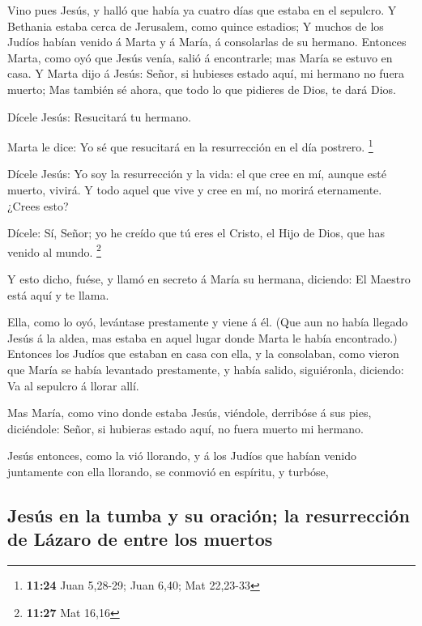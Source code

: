  Vino pues Jesús, y halló que había ya cuatro días que
estaba en el sepulcro.  Y Bethania estaba cerca de
Jerusalem, como quince estadios;  Y muchos de los Judíos
habían venido á Marta y á María, á consolarlas de su hermano.
 Entonces Marta, como oyó que Jesús venía, salió á
encontrarle; mas María se estuvo en casa.  Y Marta dijo á
Jesús: Señor, si hubieses estado aquí, mi hermano no fuera muerto;
 Mas también sé ahora, que todo lo que pidieres de Dios,
te dará Dios.

 Dícele Jesús: Resucitará tu hermano.

 Marta le dice: Yo sé que resucitará en la resurrección
en el día postrero. \footnote{\textbf{11:24} Juan 5,28-29; Juan 6,40;
  Mat 22,23-33}

 Dícele Jesús: Yo soy la resurrección y la vida: el que
cree en mí, aunque esté muerto, vivirá.  Y todo aquel que
vive y cree en mí, no morirá eternamente. ¿Crees esto?

 Dícele: Sí, Señor; yo he creído que tú eres el Cristo,
el Hijo de Dios, que has venido al mundo. \footnote{\textbf{11:27} Mat
  16,16}

 Y esto dicho, fuése, y llamó en secreto á María su
hermana, diciendo: El Maestro está aquí y te llama.

 Ella, como lo oyó, levántase prestamente y viene á él.
 (Que aun no había llegado Jesús á la aldea, mas estaba
en aquel lugar donde Marta le había encontrado.) 
Entonces los Judíos que estaban en casa con ella, y la consolaban, como
vieron que María se había levantado prestamente, y había salido,
siguiéronla, diciendo: Va al sepulcro á llorar allí.

 Mas María, como vino donde estaba Jesús, viéndole,
derribóse á sus pies, diciéndole: Señor, si hubieras estado aquí, no
fuera muerto mi hermano.

 Jesús entonces, como la vió llorando, y á los Judíos que
habían venido juntamente con ella llorando, se conmovió en espíritu, y
turbóse,

\hypertarget{jesuxfas-en-la-tumba-y-su-oraciuxf3n-la-resurrecciuxf3n-de-luxe1zaro-de-entre-los-muertos}{%
\subsection{Jesús en la tumba y su oración; la resurrección de Lázaro de
entre los
muertos}\label{jesuxfas-en-la-tumba-y-su-oraciuxf3n-la-resurrecciuxf3n-de-luxe1zaro-de-entre-los-muertos}}

